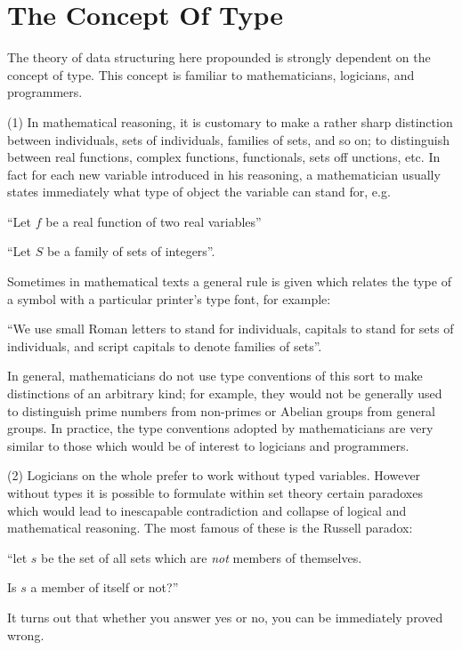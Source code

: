 \documentclass[twoside,11pt]{book}
\begin{document}
\section[The concept of type]{The Concept Of Type}

The theory of data structuring here propounded is strongly dependent on the concept of type. This concept is familiar to mathematicians, logicians, and programmers.

(1) In mathematical reasoning, it is customary to make a rather sharp distinction between individuals, sets of individuals, families of sets, and so on; to distinguish between real functions, complex functions, functionals, sets off unctions, etc. In fact for each new variable introduced in his reasoning, a mathematician usually states immediately what type of object the variable can stand for, e.g.

\quad ``Let $f$ be a real function of two real variables''

\quad ``Let $S$ be a family of sets of integers''.

Sometimes in mathematical texts a general rule is given which relates the type of a symbol with a particular printer's type font, for example:

\parindent \quad``We use small Roman letters to stand for individuals, capitals to stand for sets of individuals, and script capitals to denote families of sets''.

In general, mathematicians do not use type conventions of this sort to make distinctions of an arbitrary kind; for example, they would not be generally used to distinguish prime numbers from non-primes or Abelian groups from general groups. In practice, the type conventions adopted by mathematicians are very similar to those which would be of interest to logicians and programmers.

(2) Logicians on the whole prefer to work without typed variables. However without types it is possible to formulate within set theory certain paradoxes which would lead to inescapable contradiction and collapse of logical and mathematical reasoning. The most famous of these is the Russell paradox:

\quad \hspace{-.4em}``let $s$ be the set of all sets which are \textit{not} members of themselves.

\quad Is $s$ a member of itself or not?''

\noindent
It turns out that whether you answer yes or no, you can be immediately proved wrong.
\end{document}
